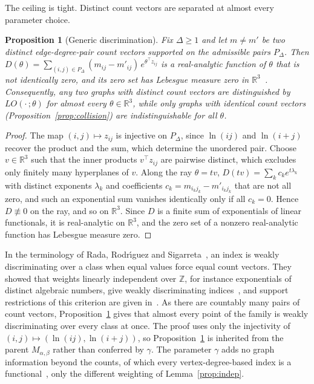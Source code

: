 \documentclass[a5paper, 10pt]{article}
\theoremstyle{plain}
\newtheorem{proposition}[theorem]{Proposition}
\theoremstyle{remark}
\theoremstyle{definition}
\begin{document}
  The ceiling is tight. Distinct count vectors are separated at almost
  every parameter choice.

  \begin{proposition}[Generic discrimination]\label{prop:generic}
  Fix $\Delta \ge 1$ and let $m \neq m'$ be two distinct
  edge-degree-pair count vectors supported on the admissible pairs
  $P_{\Delta}$. Then
  $D(\theta) = \sum_{(i,j) \in P_{\Delta}} (m_{ij} - m'_{ij})\,
  e^{\theta^{\top} z_{ij}}$ is a real-analytic function of $\theta$
  that is not identically zero, and its zero set has Lebesgue measure zero in $\mathbb{R}^3$~\cite{Mityagin2020}. Consequently, any two graphs with distinct
  count vectors are distinguished by $LO(\cdot\,;\theta)$ for almost
  every $\theta \in \mathbb{R}^3$, while only graphs with identical count
  vectors (Proposition~\ref{prop:collision}) are indistinguishable
  for all $\theta$.
  \end{proposition}

  \begin{proof}
  The map $(i,j) \mapsto z_{ij}$ is injective on $P_{\Delta}$, since
  $\ln(ij)$ and $\ln(i+j)$ recover the product and the sum, which
  determine the unordered pair. Choose $v \in \mathbb{R}^3$ such that
  the inner products $v^{\top} z_{ij}$ are pairwise distinct, which
  excludes only finitely many hyperplanes of $v$. Along the ray
  $\theta = t v$, $D(tv) = \sum_k c_k e^{t \lambda_k}$ with distinct
  exponents $\lambda_k$ and coefficients
  $c_k = m_{i_kj_k} - m'_{i_kj_k}$ that are not all zero, and such an
  exponential sum vanishes identically only if all $c_k = 0$. Hence $D \not\equiv 0$
  on the ray, and so on $\mathbb{R}^3$. Since $D$ is a finite sum of
  exponentials of linear functionals, it is real-analytic on
  $\mathbb{R}^3$, and the zero set of a nonzero real-analytic
  function has Lebesgue measure zero.
  \end{proof}

  In the terminology of Rada, Rodr\'{\i}guez and Sigarreta~\cite{RadaRodriguezSigarreta2022Weak}, an index is weakly discriminating over a class when equal values force equal count vectors. They showed that weights linearly independent over $\mathbb{Z}$, for instance exponentials of distinct algebraic numbers, give weakly discriminating indices~\cite[Theorems~3.1 and~3.8]{RadaRodriguezSigarreta2022Weak}, and support restrictions of this criterion are given in~\cite[Theorem~3, Corollary~2]{Rada2026LinearVDB}. As there are countably many pairs of count vectors, Proposition~\ref{prop:generic} gives that almost every point of the family is weakly discriminating over every class at once. The proof uses only the injectivity of $(i,j) \mapsto (\ln(ij), \ln(i+j))$, so Proposition~\ref{prop:generic} is inherited from the parent $M_{\alpha,\beta}$ rather than conferred by $\gamma$. The parameter $\gamma$ adds no graph information beyond the counts, of which every vertex-degree-based index is a functional~\cite{Rada2026LinearVDB}, only the different weighting of Lemma~\ref{prop:indep}.
\end{document}
